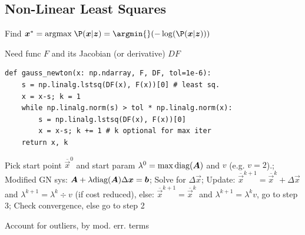 \newpage
\subsection{Non-Linear Least Squares}
Find $\vec{x}^* = \text{argmax}\; \P(\vec{x} | \vec{z}) = \argmin{}(-\log(\P(\vec{x}|\vec{z})))$

 Need func $F$ and its Jacobian (or derivative) $DF$
\rmvspace[0.3]
{\small
    \begin{verbatim}
def gauss_newton(x: np.ndarray, F, DF, tol=1e-6):
    s = np.linalg.lstsq(DF(x), F(x))[0] # least sq.
    x = x-s; k = 1
    while np.linalg.norm(s) > tol * np.linalg.norm(x):
        s = np.linalg.lstsq(DF(x), F(x))[0]
        x = x-s; k += 1 # k optional for max iter
    return x, k
\end{verbatim}
}
\rmvspace[0.4]

 Pick start point $\overline{\vec{x}}^0$ and start param $\lambda^0 = \max \text{diag}(\bm{A})$ and $v$ (e.g. $v = 2$).;
 Modified GN sys: $\bm{A} + \lambda \text{diag}(\bm{A}) \Delta \bm{x} = \bm{b}$;
 Solve for $\Delta \vec{x}$;
 Update: $\overline{\vec{x}}^{k + 1} = \overline{\vec{x}}^k + \Delta \vec{x}$ and $\lambda^{k + 1} = \lambda^k \div v$ (if cost reduced),
else: $\overline{\vec{x}}^{k + 1} = \overline{\vec{x}}^k$ and $\lambda^{k + 1} = \lambda^k v$, go to step 3;
 Check convergence, else go to step 2

 Account for outliers, by mod. err. terms
